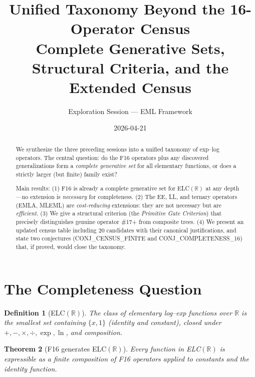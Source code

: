 \documentclass[11pt]{article}
\title{Unified Taxonomy Beyond the 16-Operator Census\\
{\large Complete Generative Sets, Structural Criteria, and the Extended Census}}
\author{Exploration Session --- EML Framework}
\date{2026-04-21}
\newtheorem{theorem}{Theorem}
\newtheorem{definition}[theorem]{Definition}
\begin{document}
\maketitle

\begin{abstract}
We synthesize the three preceding sessions into a unified taxonomy of
exp--log operators. The central question: do the F16 operators plus any
discovered generalizations form a \emph{complete generative set} for all
elementary functions, or does a strictly larger (but finite) family exist?

Main results:
(1) F16 is already a complete generative set for ELC$(\mathbb{R})$ at any depth---no
    extension is \emph{necessary} for completeness.
(2) The EE, LL, and ternary operators (EMLA, MLEML) are \emph{cost-reducing}
    extensions: they are not necessary but are \emph{efficient}.
(3) We give a structural criterion (the \emph{Primitive Gate Criterion}) that
    precisely distinguishes genuine operator \#17+ from composite trees.
(4) We present an updated census table including 20 candidates with their
    canonical justifications, and state two conjectures (CONJ\_CENSUS\_FINITE
    and CONJ\_COMPLETENESS\_16) that, if proved, would close the taxonomy.
\end{abstract}

\tableofcontents
\bigskip

\section{The Completeness Question}
\label{sec:completeness}

\begin{definition}[ELC$(\mathbb{R})$]
The class of \emph{elementary log--exp functions} over $\mathbb{R}$ is the
smallest set containing $\{x, 1\}$ (identity and constant),
closed under $+, -, \times, \div, \exp, \ln$, and composition.
\end{definition}

\begin{theorem}[F16 generates ELC$(\mathbb{R})$]
\label{thm:f16-complete}
Every function in ELC$(\mathbb{R})$ is expressible as a finite composition
of F16 operators applied to constants and the identity function.
\end{theorem}
\end{document}
